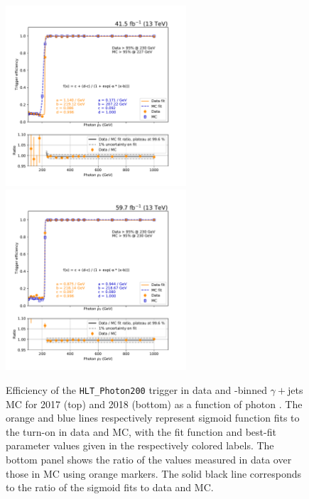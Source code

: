 \begin{figure}[hbtp]
    \begin{center}
        \includegraphics[width=0.6\textwidth]{Efficiency/Photon/fit_HLT_PFHT1050_2017.pdf}
        \includegraphics[width=0.6\textwidth]{Efficiency/Photon/fit_HLT_PFHT1050_2018.pdf}
        \caption{Efficiency of the \texttt{HLT\_Photon200} trigger in data and \HT-binned $\gamma+$jets MC for 2017 (top) and 2018 (bottom) 
        as a function of photon \pt. The orange and blue lines respectively represent sigmoid function fits to the turn-on in data and MC, 
        with the fit function and best-fit parameter values given in the respectively colored labels. The bottom panel shows the ratio of the values measured 
        in data over those in MC using orange markers. The solid black line corresponds to the ratio of the sigmoid fits to data and MC.}
        \label{fig:hlteff_photon}
    \end{center}
\end{figure}

\clearpage

